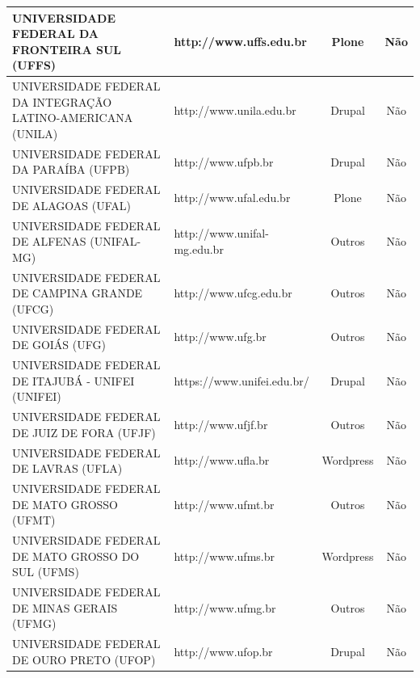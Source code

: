 \begin{quadro}[htb]
{\begin{tabular}{|l|l|c|c|}
			UNIVERSIDADE FEDERAL DA FRONTEIRA SUL (UFFS)                                   & http://www.uffs.edu.br            & Plone     & Não           \\ \hline
			UNIVERSIDADE FEDERAL DA INTEGRAÇÃO LATINO-AMERICANA (UNILA)                    & http://www.unila.edu.br           & Drupal    & Não           \\ \hline
			UNIVERSIDADE FEDERAL DA PARAÍBA (UFPB)                                         & http://www.ufpb.br                & Drupal    & Não           \\ \hline
			UNIVERSIDADE FEDERAL DE ALAGOAS (UFAL)                                         & http://www.ufal.edu.br            & Plone     & Não           \\ \hline
			UNIVERSIDADE FEDERAL DE ALFENAS (UNIFAL-MG)                                    & http://www.unifal-mg.edu.br       & Outros    & Não           \\ \hline
			UNIVERSIDADE FEDERAL DE CAMPINA GRANDE (UFCG)                                  & http://www.ufcg.edu.br            & Outros    & Não           \\ \hline
			UNIVERSIDADE FEDERAL DE GOIÁS (UFG)                                            & http://www.ufg.br                 & Outros    & Não           \\ \hline
			UNIVERSIDADE FEDERAL DE ITAJUBÁ - UNIFEI (UNIFEI)                              & https://www.unifei.edu.br/        & Drupal    & Não           \\ \hline
			UNIVERSIDADE FEDERAL DE JUIZ DE FORA (UFJF)                                    & http://www.ufjf.br                & Outros    & Não           \\ \hline
			UNIVERSIDADE FEDERAL DE LAVRAS (UFLA)                                          & http://www.ufla.br                & Wordpress & Não           \\ \hline
			UNIVERSIDADE FEDERAL DE MATO GROSSO (UFMT)                                     & http://www.ufmt.br                & Outros    & Não           \\ \hline
			UNIVERSIDADE FEDERAL DE MATO GROSSO DO SUL (UFMS)                              & http://www.ufms.br                & Wordpress & Não           \\ \hline
			UNIVERSIDADE FEDERAL DE MINAS GERAIS (UFMG)                                    & http://www.ufmg.br                & Outros    & Não           \\ \hline
			UNIVERSIDADE FEDERAL DE OURO PRETO (UFOP)                                      & http://www.ufop.br                & Drupal    & Não           \\ \hline

\end{tabular}}
\end{quadro}
